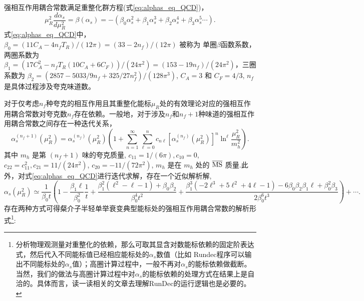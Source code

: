 强相互作用耦合常数满足重整化群方程(式\eqref{eq:alphas_eq_QCD})，
\begin{equation}
    \mu_R^2 \frac{d \alpha_s}{d \mu_R^2}=\beta\left(\alpha_s\right)=-\left(\beta_0 \alpha_s^2+\beta_1 \alpha_s^3+\beta_2 \alpha_s^4+\beta_3 \alpha_s^5\cdots\right).
    \label{eq:alphas_eq_QCD}
    \end{equation}
式\eqref{eq:alphas_eq_QCD}中，  \( \beta_0 = (11 C_A - 4 n_f T_R)/(12 \pi) = (33 - 2 n_f)/(12 \pi) \) 被称为 单圈\(\beta\)函数系数，两圈系数为 \( \beta_1 = (17 C_A^2 - n_f T_R (10 C_A + 6 C_F))/(24 \pi^2) = (153 - 19 n_f)/(24 \pi^2) \)，三圈系数为 \( \beta_2 = (2857 - 5033/9 n_f + 325/27 n_f^2)/(128 \pi^3)\), \( C_A =3\) 和 \( C_F=4/3 \), \( n_f \) 是具体过程涉及夸克味道数。

对于仅考虑$n_{f}$种夸克的相互作用且其重整化能标$\mu_{R}$处的有效理论对应的强相互作用耦合常数对夸克数$n_{f}$存在依赖。一般地，对于涉及$n_{f}$和$n_{f}+1$种味道的强相互作用耦合常数之间存在一种迭代关系，
\begin{equation}
    \alpha_s^{\left(n_f+1\right)}\left(\mu_R^2\right)=\alpha_s^{\left(n_f\right)}\left(\mu_R^2\right)\left(1+\sum_{n=1}^{\infty} \sum_{\ell=0}^n c_{n \ell}\left[\alpha_s^{\left(n_f\right)}\left(\mu_R^2\right)\right]^n \ln ^{\ell} \frac{\mu_R^2}{m_h^2}\right).
    \label{eq:alpha_s_replace}
    \end{equation}
其中 \(m_h\) 是第 \(\left(n_f+1\right)\) 味的夸克质量, \(c_{11}=1/(6 \pi), c_{10}=0\), \(c_{22}=c_{11}^2, c_{21}=11/(24 \pi^2)\), \(c_{20}=-11/(72 \pi^2)\), \(m_h\) 是在 \(m_h\) 处的 \(\mathrm{\overline{\text{MS}}}\) 质量.此外，对式\eqref{eq:alphas_eq_QCD}进行迭代求解，存在一个近似解析解,
{\scriptsize
\begin{equation}
\alpha_s\left(\mu_R^2\right)  \simeq \frac{1}{\beta_0 t}\left(1-\frac{\beta_1 \ell}{\beta_0^2} \frac{1}{t}+\frac{\beta_1^2\left(\ell^2-\ell-1\right)+\beta_0 \beta_2}{\beta_0^4 t^2} 
+\frac{\beta_1^3\left(-2 \ell^3+5 \ell^2+4 \ell-1\right)-6 \beta_0 \beta_2 \beta_1 \ell+\beta_0^2 \beta_3}{2 \beta_0^6 t^3}\right)+\cdots.
\label{eq:alpha_s_solution}
\end{equation}
}
存在两种方式可得粲介子半轻单举衰变典型能标处的强相互作用耦合常数的解析形式\footnote{分析物理观测量对重整化的依赖，那么可取其显含对数能标依赖的固定阶表达式，然后代入不同能标值已经相应能标处的$\alpha_s$数值（比如 Rundec程序可以输出不同能标处的$\alpha_s$值）；高圈计算过程中，一般不再对$\alpha_s$的能标依赖做截断。当然，我们的做法与高圈计算过程中对$\alpha_s$的能标依赖的处理方式在结果上是自洽的。具体而言，读一读相关的文章去理解RunDec的运行逻辑也是必要的。}: 

